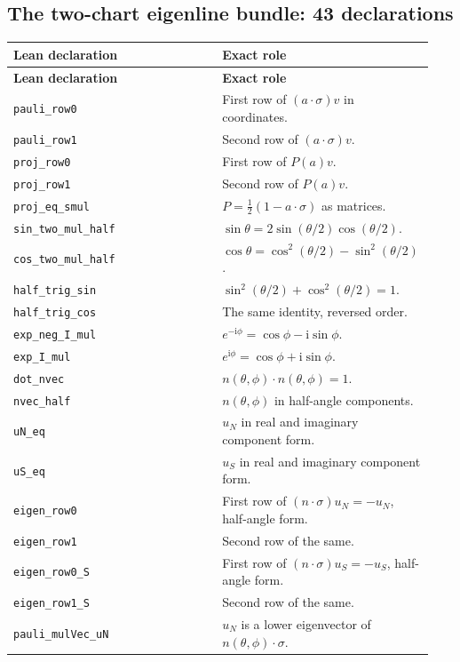 \documentclass[11pt]{article}
\theoremstyle{definition}\newtheorem{definition}[theorem]{Definition}
\theoremstyle{remark}\newtheorem{remark}[theorem]{Remark}
\newcommand{\ii}{\mathrm{i}}
\begin{document}
\subsection*{The two-chart eigenline bundle: 43 declarations}
\begin{longtable}{p{0.49\linewidth}p{0.45\linewidth}}
\toprule\textbf{Lean declaration} & \textbf{Exact role}\\\midrule\endfirsthead
\toprule\textbf{Lean declaration} & \textbf{Exact role}\\\midrule\endhead
\texttt{pauli\_row0} & First row of $(a\cdot\sigma)v$ in coordinates.\\
\texttt{pauli\_row1} & Second row of $(a\cdot\sigma)v$.\\
\texttt{proj\_row0} & First row of $P(a)v$.\\
\texttt{proj\_row1} & Second row of $P(a)v$.\\
\texttt{proj\_eq\_smul} & $P=\tfrac12(1-a\cdot\sigma)$ as matrices.\\
\texttt{sin\_two\_mul\_half} & $\sin\theta=2\sin(\theta/2)\cos(\theta/2)$.\\
\texttt{cos\_two\_mul\_half} & $\cos\theta=\cos^2(\theta/2)-\sin^2(\theta/2)$.\\
\texttt{half\_trig\_sin} & $\sin^2(\theta/2)+\cos^2(\theta/2)=1$.\\
\texttt{half\_trig\_cos} & The same identity, reversed order.\\
\texttt{exp\_neg\_I\_mul} & $e^{-\ii\phi}=\cos\phi-\ii\sin\phi$.\\
\texttt{exp\_I\_mul} & $e^{\ii\phi}=\cos\phi+\ii\sin\phi$.\\
\texttt{dot\_nvec} & $n(\theta,\phi)\cdot n(\theta,\phi)=1$.\\
\texttt{nvec\_half} & $n(\theta,\phi)$ in half-angle components.\\
\texttt{uN\_eq} & $u_N$ in real and imaginary component form.\\
\texttt{uS\_eq} & $u_S$ in real and imaginary component form.\\
\texttt{eigen\_row0} & First row of $(n\cdot\sigma)u_N=-u_N$, half-angle form.\\
\texttt{eigen\_row1} & Second row of the same.\\
\texttt{eigen\_row0\_S} & First row of $(n\cdot\sigma)u_S=-u_S$, half-angle form.\\
\texttt{eigen\_row1\_S} & Second row of the same.\\
\texttt{pauli\_mulVec\_uN} & $u_N$ is a lower eigenvector of $n(\theta,\phi)\cdot\sigma$.\\

\end{longtable}
\end{document}
